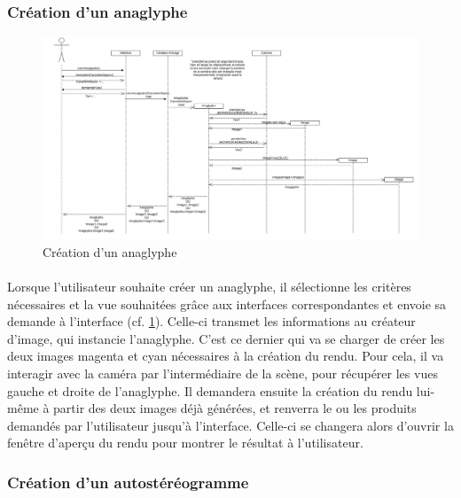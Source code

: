 \subsubsection{Création d'un anaglyphe}

\begin{figure}[h]
		\centering
		\includegraphics[scale=0.25]{creeranaglyphe.jpg}
		\caption{\label{fig:creerAnaglyphe} Création d'un anaglyphe}
\end{figure}

\paragraph{}
Lorsque l’utilisateur souhaite créer un anaglyphe, il sélectionne les critères nécessaires et la vue souhaitées grâce aux interfaces correspondantes et envoie sa demande à l’interface (cf. \ref{fig:creerAnaglyphe}). Celle-ci transmet les informations au créateur d’image, qui instancie l’anaglyphe. C’est ce dernier qui va se charger de créer les deux images magenta et cyan nécessaires à la création du rendu. Pour cela, il va interagir avec la caméra par l’intermédiaire de la scène, pour récupérer les vues gauche et droite de l’anaglyphe. Il demandera ensuite la création du rendu lui-même à partir des deux images déjà générées, et renverra le ou les produits demandés par l’utilisateur jusqu’à l’interface. Celle-ci se changera alors d’ouvrir la fenêtre d’aperçu du rendu pour montrer le résultat à l’utilisateur.

\subsubsection{Création d'un autostéréogramme}

